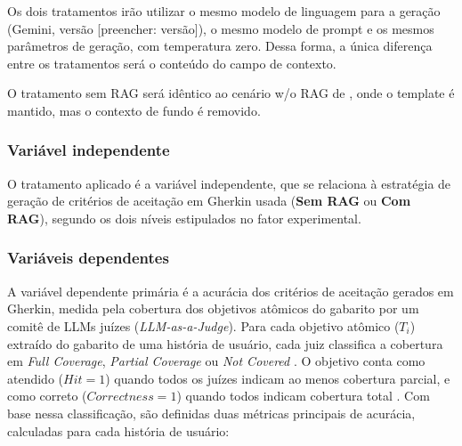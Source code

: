 Os dois tratamentos irão utilizar o mesmo modelo de linguagem para a geração (Gemini, versão [preencher: versão]), o mesmo modelo de prompt e os mesmos parâmetros de geração, com temperatura zero. Dessa forma, a única diferença entre os tratamentos será o conteúdo do campo de contexto.


O tratamento sem RAG será idêntico ao cenário w/o RAG de , onde o template é mantido, mas o contexto de fundo é removido.

\subsubsection*{Variável independente}

O tratamento aplicado é a variável independente, que se relaciona à estratégia de geração de critérios de aceitação em Gherkin usada (\textbf{Sem RAG} ou \textbf{Com RAG}), segundo os dois níveis estipulados no fator experimental.

\subsubsection*{Variáveis dependentes}

A variável dependente primária é a acurácia dos critérios de aceitação gerados em Gherkin, medida pela cobertura dos objetivos atômicos do gabarito por um comitê de LLMs juízes (\textit{LLM-as-a-Judge}). Para cada objetivo atômico ($T_i$) extraído do gabarito de uma história de usuário, cada juiz classifica a cobertura em \textit{Full Coverage}, \textit{Partial Coverage} ou \textit{Not Covered} \cite{wang2025}. O objetivo conta como atendido ($Hit = 1$) quando todos os juízes indicam ao menos cobertura parcial, e como correto ($Correctness = 1$) quando todos indicam cobertura total \cite{wang2025}. Com base nessa classificação, são definidas duas métricas principais de acurácia, calculadas para cada história de usuário:


